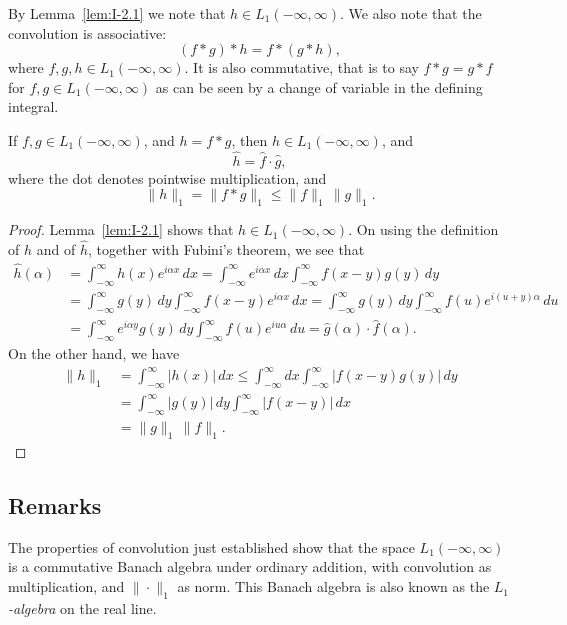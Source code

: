 By Lemma~\ref{lem:I-2.1} we note that $h\in L_1(-\infty,\infty)$. We also note that the convolution is associative:
\begin{equation*}
(f*g)*h=f*(g*h),
\end{equation*}
where $f,g,h\in L_1(-\infty,\infty)$. It is also commutative, that is to say $f*g=g*f$ for $f,g\in L_1(-\infty,\infty)$ as can be seen by a change of variable in the defining integral.

\begin{theorem}\label{thm:I-2}
If $f,g\in L_1(-\infty,\infty)$, and $h=f*g$, then $h\in L_1(-\infty,\infty)$, and
\begin{equation}\label{eq:I-2.2}
\hat h=\hat f\cdot\hat g,
\end{equation}
where the dot denotes pointwise multiplication, and
\begin{equation}\label{eq:I-2.3}
\|h\|_1=\|f*g\|_1\le\|f\|_1\,\|g\|_1.
\end{equation}
\end{theorem}

\begin{proof}
Lemma~\ref{lem:I-2.1} shows that $h\in L_1(-\infty,\infty)$. On using the definition of $h$ and of $\hat h$, together with Fubini's theorem, we see that
\begin{align*}
\hat h(\alpha)&=\int_{-\infty}^{\infty}h(x)e^{i\alpha x}\,dx
=\int_{-\infty}^{\infty}e^{i\alpha x}\,dx\int_{-\infty}^{\infty}f(x-y)g(y)\,dy\\
&=\int_{-\infty}^{\infty}g(y)\,dy\int_{-\infty}^{\infty}f(x-y)e^{i\alpha x}\,dx
=\int_{-\infty}^{\infty}g(y)\,dy\int_{-\infty}^{\infty}f(u)e^{i(u+y)\alpha}\,du\\
&=\int_{-\infty}^{\infty}e^{i\alpha y}g(y)\,dy\int_{-\infty}^{\infty}f(u)e^{iu\alpha}\,du
=\widehat g(\alpha)\cdot\widehat f(\alpha).
\end{align*}
On the other hand, we have
\begin{equation*}
\begin{aligned}
\|h\|_1 &= \int_{-\infty}^{\infty}|h(x)|\,dx
\le\int_{-\infty}^{\infty}dx\int_{-\infty}^{\infty}|f(x-y)g(y)|\,dy\\
&= \int_{-\infty}^{\infty}|g(y)|\,dy\int_{-\infty}^{\infty}|f(x-y)|\,dx\\
&= \|g\|_1\,\|f\|_1.
\end{aligned}
\end{equation*}
\end{proof}

\subsection*{Remarks}
The properties of convolution just established show that the space $L_1(-\infty,\infty)$ is a commutative Banach algebra under ordinary addition, with convolution as multiplication, and $\|\cdot\|_1$ as norm. This Banach algebra is also known as the \emph{$L_1$-algebra} on the real line.

